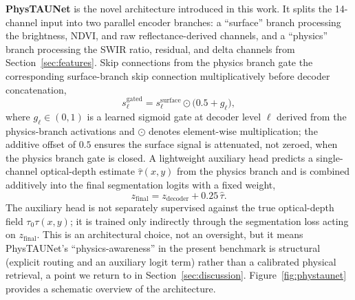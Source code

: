 \documentclass[10pt,twocolumn]{article}
\begin{document}
\textbf{PhysTAUNet} is the novel architecture introduced in this work. It splits the 14-channel input into two parallel encoder branches: a ``surface'' branch processing the brightness, NDVI, and raw reflectance-derived channels, and a ``physics'' branch processing the SWIR ratio, residual, and delta channels from Section~\ref{sec:features}. Skip connections from the physics branch gate the corresponding surface-branch skip connection multiplicatively before decoder concatenation,
\begin{equation}
s^{\text{gated}}_{\ell} = s^{\text{surface}}_{\ell} \odot \big(0.5 + g_{\ell}\big),
\label{eq:physgate}
\end{equation}
where $g_{\ell} \in (0,1)$ is a learned sigmoid gate at decoder level $\ell$ derived from the physics-branch activations and $\odot$ denotes element-wise multiplication; the additive offset of $0.5$ ensures the surface signal is attenuated, not zeroed, when the physics branch gate is closed. A lightweight auxiliary head predicts a single-channel optical-depth estimate $\hat\tau(x,y)$ from the physics branch and is combined additively into the final segmentation logits with a fixed weight,
\begin{equation}
z_{\text{final}} = z_{\text{decoder}} + 0.25\,\hat\tau .
\label{eq:auxhead}
\end{equation}
The auxiliary head is not separately supervised against the true optical-depth field $\tau_0\tau(x,y)$; it is trained only indirectly through the segmentation loss acting on $z_{\text{final}}$. This is an architectural choice, not an oversight, but it means PhysTAUNet's ``physics-awareness'' in the present benchmark is structural (explicit routing and an auxiliary logit term) rather than a calibrated physical retrieval, a point we return to in Section~\ref{sec:discussion}. Figure~\ref{fig:phystaunet} provides a schematic overview of the architecture.
\end{document}
